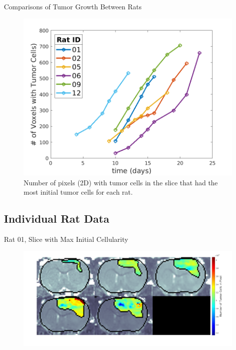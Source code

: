 \documentclass{beamer}
\begin{document}
\begin{frame}{Comparisons of Tumor Growth Between Rats}
	\begin{minipage}[T][.7\textheight][t]{\textwidth}
		\begin{figure}
    	\centering
    	\includegraphics[width=.45\textwidth]{../../mouse-data/images/areatumorcells.png}    	
    	\caption{Number of pixels (2D) with tumor cells in the slice that had the most initial tumor cells for each rat.}
    	\end{figure}
	\end{minipage}
\end{frame}

\subsection{Individual Rat Data}
\begin{frame}{Rat 01, Slice with Max Initial Cellularity}
    \begin{minipage}[t][.7\textheight][t]{\textwidth}
    	\begin{figure}
    	\centering
    	\includegraphics[width=.9\textwidth]{../../mouse-data/images/Montage01.png}
    	\end{figure}
	\end{minipage}  
\end{frame}
\end{document}
